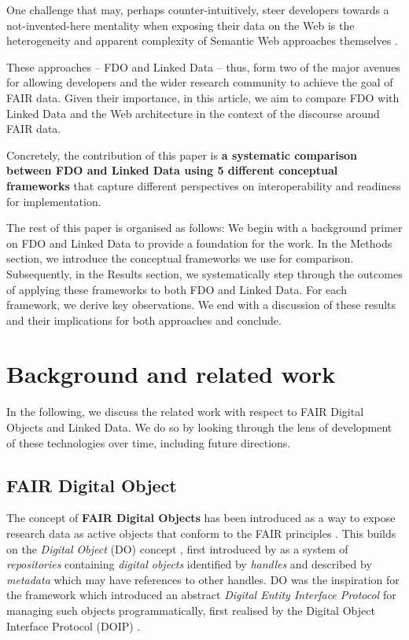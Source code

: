 \documentclass[fleqn,10pt,lineno]{wlpeerjlua}
\begin{document}
One challenge that may, perhaps counter-intuitively, steer developers towards a not-invented-here mentality \autocite{stefiDevelopersMakeUnbiased2015,stefiDevelopReuseTwo2015a} when exposing their data on the Web is the heterogeneity and apparent complexity of Semantic Web approaches themselves \autocite{merono-penuelaWebDataApis2021b}.

These approaches -- FDO and Linked Data -- thus, form two of the major avenues for allowing developers and the wider research community to achieve the goal of FAIR data. Given their importance, in this article, we aim to compare FDO with Linked Data and the Web architecture in the context of the discourse around FAIR data.

Concretely, the contribution of this paper is {\bf a systematic comparison between FDO and Linked Data using 5 different conceptual frameworks} that capture different perspectives on interoperability and readiness for implementation.

The rest of this paper is organised as follows: We begin with a background primer on FDO and Linked Data to provide a foundation for the work. In the Methods section, we introduce the conceptual frameworks we use for comparison. Subsequently, in the Results section, we systematically step through the outcomes of applying these frameworks to both FDO and Linked Data. For each framework, we derive key observations. We end with a discussion of these results and their implications for both approaches and conclude.

\section*{Background and related work}\label{sec:background}

In the following, we discuss the related work with respect to FAIR Digital Objects and Linked Data. We do so by looking through the lens of development of these technologies over time, including future directions.

\subsection*{FAIR Digital Object}\label{sec:fdo}

The concept of \textbf{FAIR Digital Objects} \autocite{schultesFAIRPrinciplesDigital2019a} has been introduced as a way to expose research data as active objects that conform to the FAIR principles \autocite{wilkinsonFAIRGuidingPrinciples2016e}. This builds on the \emph{Digital Object} (DO) concept \autocite{kahnFrameworkDistributedDigital2006b}, first introduced by \textcite{kahnFrameworkDistributedDigital1995a} as a system of \emph{repositories} containing \emph{digital objects} identified by \emph{handles} and described by \emph{metadata} which may have references to other handles. DO was the inspiration for the \textcite{x1255FrameworkDiscovery} framework which introduced an abstract \emph{Digital Entity Interface Protocol} for managing such objects programmatically, first realised by the Digital Object Interface Protocol (DOIP) \autocite{DigitalObjectInterface}.
\end{document}
